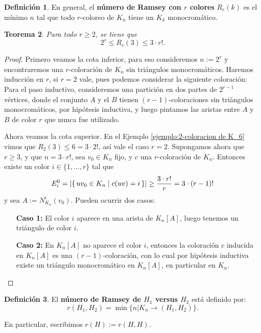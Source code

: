 \documentclass[12pt]{report}
\theoremstyle{plain}
\newtheorem{theorem}{Teorema}[section]
\theoremstyle{definition}
\newtheorem{definition}[theorem]{Definición}
\newcommand{\abs}[1]{\left \vert #1 \right \vert}
\begin{document}
\begin{definition}
En general, el \textbf{número de Ramsey con $r$ colores} $R_r (k)$ es el mínimo $n$ tal que todo $r$-coloreo de $K_n$ tiene un $K_k$ monocromático.
\end{definition}

\begin{theorem}
Para todo $r \geq 2$, se tiene que
\[
    2^r \leq R_r (3) \leq 3 \cdot r!.
\]
\end{theorem}
\begin{proof}
Primero veamos la cota inferior, para eso consideremos $n:= 2^r$ y encontraremos una $r$-coloración de $K_n$ sin triángulos monocromáticos. Haremos inducción en $r$, si $r = 2$ vale, pues podemos considerar la siguiente coloración:
Para el paso inductivo, consideremos una partición en dos partes de $2^{r-1}$ vértices, donde el conjunto $A$ y el $B$ tienen $(r-1)$-coloraciones sin triángulos monocromáticos, por hipótesis inductiva, y luego pintamos las aristas entre $A$ y $B$ de color $r$ que nunca fue utilizado.

Ahora veamos la cota superior. En el Ejemplo \ref{ejemplo:2-coloracion de K_6} vimos que $R_2(3) \leq 6 = 3 \cdot 2 !$, así vale el caso $r = 2$. Supongamos ahora que $r \geq 3$, y que $n = 3 \cdot r!$, sea $v_0 \in K_n$ fijo, y $c$ una $r$-coloración de $K_n$. Entonces existe un color $i \in  \{1, \ldots, r\}$ tal que
\[
    E_i^0 = \abs{\set{uv_0 \in K_n | c (uv) = i}} \geq \frac{3 \cdot r !}{r} = 3 \cdot (r-1)!
\]
y sea $A := N_{K_n}^i (v_0)$. Pueden ocurrir dos casos:
\begin{enumerate}
\item[\textbf{Caso 1:}] El color $i$ aparece en una arista de $K_n [A]$, luego tenemos un triángulo de color $i$.
\item[\textbf{Caso 2:}] En $K_n [A]$ no aparece el color $i$, entonces la coloración $c$ inducida en $K_n [A]$ es una $(r-1)$-coloración, con lo cual por hipótesis inductiva existe un triángulo monocromático en $K_n [A]$, en particular en $K_n$.
\end{enumerate}

\end{proof}


\begin{definition}
El \textbf{número de Ramsey de $H_1$ versus $H_2$} está definido por:
\[
    r(H_1, H_2) = \min \{ n | K_n \to (H_1, H_2)\}.
\]

En particular, escribimos $r (H):= r (H,H)$.
\end{definition}
\end{document}
